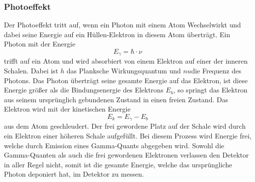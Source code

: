 \subsubsection{Photoeffekt}
Der Photoeffekt tritt auf, wenn ein Photon mit einem Atom Wechselwirkt und dabei seine Energie auf ein Hüllen-Elektron in diesem Atom 
überträgt. Ein Photon mit der Energie 
\begin{equation}
     E_{\gamma} = \hbar \cdot \nu 
\end{equation} 
trifft auf ein Atom und wird absorbiert von einem Elektron auf einer der inneren Schalen.
Dabei ist \( h \) das Planksche Wirkungsquantum und \(nu \)die Frequenz des Photons.
Das Photon überträgt seine gesamte Energie auf das Elektron, ist diese Energie größer als die Bindungsenergie des Elektrons $E_b$, so springt das 
Elektron aus seinem ursprünglich gebundenen Zustand in einen freien Zustand. Das Elektron wird mit der kinetischen Energie 
\begin{equation}
    E_k=E_{\gamma}-E_b 
\end{equation} 
aus dem Atom geschleudert. Der frei gewordene Platz auf der Schale wird durch ein Elektron einer höheren Schale aufgefüllt. Bei diesem Prozess wird Energie frei, 
welche durch Emission eines Gamma-Quants abgegeben wird. Sowohl die Gamma-Quanten als auch die frei gewordenen Elektronen verlassen den Detektor in aller Regel nicht,
somit ist die gesamte Energie, welche das ursprüngliche Photon deponiert hat, im Detektor zu messen.
\cite{Strahlung_Arten}

